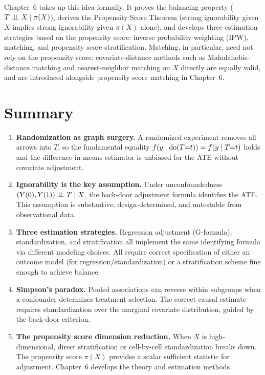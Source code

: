 \documentclass[master.tex]{subfiles}
\begin{document}
\begin{tcolorbox}[defstyle, title={Bridge to Chapter~6}]
Chapter~6 takes up this idea formally.  It proves the balancing property
($T \perp\!\!\!\perp X \mid \pi(X)$), derives the Propensity Score Theorem
(strong ignorability given $X$ implies strong ignorability given $\pi(X)$
alone), and develops three estimation strategies based on the propensity
score: inverse probability weighting (IPW), matching, and propensity
score stratification.  Matching, in particular, need not rely on the
propensity score: covariate-distance methods such as Mahalanobis-distance
matching and nearest-neighbor matching on $X$ directly are equally valid,
and are introduced alongside propensity score matching in Chapter~6.
\end{tcolorbox}

\section{Summary}

\begin{enumerate}
  \item \textbf{Randomization as graph surgery.}  A randomized
    experiment removes all arrows into $T$, so the fundamental equality
    $f(y \mid \mathrm{do}(T{=}t)) = f(y \mid T{=}t)$ holds and the
    difference-in-means estimator is unbiased for the ATE without
    covariate adjustment.

  \item \textbf{Ignorability is the key assumption.}  Under
    unconfoundedness $(Y(0),Y(1)) \perp\!\!\!\perp T \mid X$, the back-door
    adjustment formula identifies the ATE.  This assumption is
    substantive, design-determined, and untestable from observational
    data.

  \item \textbf{Three estimation strategies.}  Regression adjustment
    (G-formula), standardization, and stratification all implement the
    same identifying formula via different modeling choices.  All
    require correct specification of either an outcome model (for
    regression/standardization) or a stratification scheme fine enough
    to achieve balance.

  \item \textbf{Simpson's paradox.}  Pooled associations can reverse
    within subgroups when a confounder determines treatment selection.
    The correct causal estimate requires standardization over the
    marginal covariate distribution, guided by the back-door criterion.

  \item \textbf{The propensity score dimension reduction.}  When $X$
    is high-dimensional, direct stratification or cell-by-cell
    standardization breaks down.  The propensity score $\pi(X)$ provides
    a scalar sufficient statistic for adjustment.  Chapter~6 develops
    the theory and estimation methods.
\end{enumerate}
\end{document}
